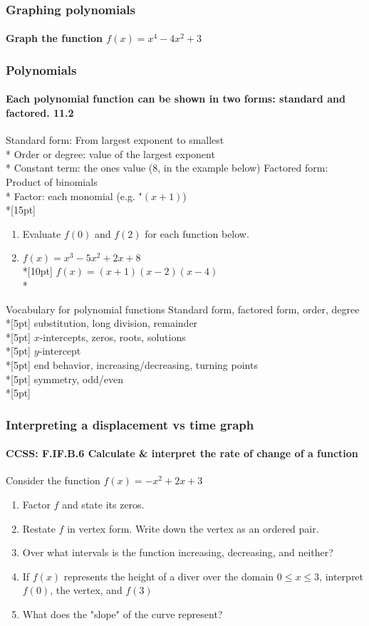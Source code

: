 \documentclass{beamer}
\begin{document}
\frame
{
  \frametitle{Graphing polynomials}
  \framesubtitle{Graph the function $f(x)=x^4-4x^2+3$}
  
}

\frame
{
  \frametitle{Polynomials}
  \framesubtitle{Each polynomial function can be shown in two forms: standard and factored. \qquad \qquad \qquad \alert{11.2}}
\alert{Standard form}: From largest exponent to smallest\\*
\qquad \alert{Order or degree}: value of the largest exponent\\*
\qquad \alert{Constant term}: the ones value (8, in the example below)
\alert{Factored form}: Product of binomials\\*
\qquad \alert{Factor}: each monomial (e.g. "$(x+1)$)\\*[15pt]
  \begin{enumerate}
    \item Evaluate $f(0)$ and $f(2)$ for each function below.
      \item $f(x)=x^3-5x^2+2x+8$ \qquad \\*[10pt]
      $f(x)=(x+1)(x-2)(x-4)$\\*

  \end{enumerate}
}

\begin{frame}{Vocabulary for polynomial functions}
    Standard form, factored form, order, degree\\*[5pt]
    substitution, long division, remainder\\*[5pt]
    $x$-intercepts, zeros, roots, solutions\\*[5pt]
    $y$-intercept\\*[5pt]
    end behavior, increasing/decreasing, turning points\\*[5pt]
    symmetry, odd/even\\*[5pt]
\end{frame}

\frame
{
  \frametitle{Interpreting a displacement vs time graph}
  \framesubtitle{CCSS: F.IF.B.6 Calculate \& interpret the rate of change of a function}

  \begin{block}{Consider the function $f(x)=-x^2+2x+3$}
  \begin{enumerate}
      \item Factor $f$ and state its zeros.
      \item Restate $f$ in vertex form. Write down the vertex as an ordered pair.
      \item Over what intervals is the function increasing, decreasing, and neither?
      \item If $f(x)$ represents the height of a diver over the domain $0 \leq x \leq 3$, interpret $f(0)$, the vertex, and $f(3)$
      \item What does the "slope" of the curve represent?
  \end{enumerate}
  \end{block}
}
\end{document}
